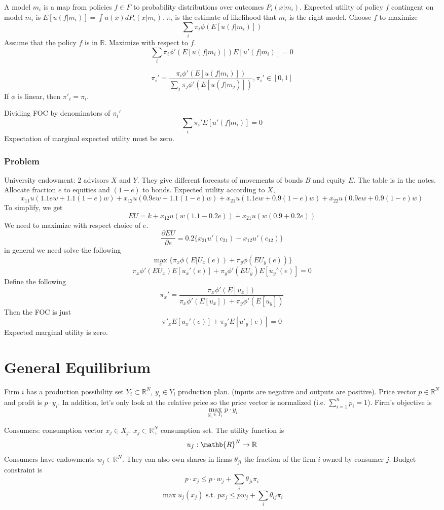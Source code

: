 \documentclass[11pt, a4paper, oneside]{article}
\theoremstyle{definition}
\theoremstyle{proposition}
\theoremstyle{corollary}
\theoremstyle{lemma}
\theoremstyle{theorem}
\begin{document}
A model $m_i$ is a map from policies $f \in F$ to probability distributions over outcomes $P_i(x|m_i)$. Expected utility of policy $f$ contingent on model $m_i$ is $E[u(f|m_i)]= \int u(x)dP_i(x|m_i)$. $\pi_i$ is the estimate of likelihood that $m_i$ is the right model. Choose $f$ to maximize 
$$\sum_i \pi_i \phi(E[u(f|m_i)])$$
Assume that the policy $f$ is in $\mathbb{R}$. Maximize with respect to $f$. 
$$\sum_i \pi_i \phi'(E[u(f|m_i)])E[u'(f|m_i)]=0$$ 

$$\pi_i'=\frac{\pi_i\phi'(E[u(f|m_i)])}{\sum_j \pi_j \phi'(E[u(f|m_j)])}, \pi_i'\in[0, 1]$$
If $\phi$ is linear, then $\pi'_i = \pi_i$. 

Dividing FOC by denominators of $\pi_i'$
$$\sum_i \pi_i' E[u'(f|m_i)]= 0$$
Expectation of marginal expected utility must be zero. 
\subsubsection{Problem}
University endowment: 2 advisors $X$ and $Y$. They give different forecasts of movements of bonds $B$ and equity $E$. The table is in the notes. Allocate fraction $e$ to equities and $(1-e)$ to bonds. Expected utility according to $X$,
$$x_{11}u(1.1ew+ 1.1(1-e)w) +x_{12}u(0.9ew+1.1(1-e)w) +x_{21}u(1.1ew+0.9(1-e)w)+x_{22}u(0.9ew+0.9(1-e)w)$$
To simplify, we get
$$EU=k+x_{12}u(w(1.1-0.2e))+x_{21}u(w(0.9+0.2e))$$
We need to maximize with respect choice of $e$. 
$$\frac{\partial EU}{\partial e} = 0.2\{x_{21}u'(c_{21})-x_{12}u'(c_{12})\}$$
in general we need solve the following
$$\max_e\{\pi_x\phi(E[U_x(e)) +\pi_y\phi(EU_y(e))\}$$
$$\pi_x\phi'(EU_x)E[u_x'(e)]+\pi_y\phi'(EU_y)E[u_y'(e)] = 0$$
Define the following
$$\pi_x'= \frac{\pi_x\phi'(E[u_x])}{\pi_x\phi'(E[u_x])+\pi_y\phi'(E[u_y])}$$
Then the FOC is just
$$\pi'_xE[u_x'(e)]+\pi_y'E[u'_y(e)]= 0$$
Expected marginal utility is zero. 

\section{General Equilibrium}
Firm $i$ has a production possibility set $Y_i\subset \mathbb{R}^N$, $y_i\in Y_i$ production plan. (inputs are negative and outputs are positive). Price vector $p \in \mathbb{R}^N$ and profit is $p\cdot y_i$. In addition, let's only look at the relative price so the price vector is normalized (i.e. $\sum_{i=1}^n p_i = 1$). Firm's objective is 
$$\max_{y_i \in Y_i} p\cdot y_i$$

Consumers: consumption vector $x_j \in X_j$. $x_j \subset \mathbb{R}^N_+$ consumption set. The utility function is 
$$u_f: \mathb{R}^N \to \mathbb{R}$$ 
Consumers have endowments $w_j \in \mathbb{R}^N$. They can also own shares in firms $\theta_{ji}$ the fraction of the firm $i$ owned by consumer $j$. Budget constraint is
$$p \cdot x_j \leq p\cdot w_j + \sum_i \theta_{ji}\pi_i$$
$$\max u_j(x_j) \text{ s.t. } px_j \leq pw_j + \sum_i\theta_{ij}\pi_i$$
\end{document}
